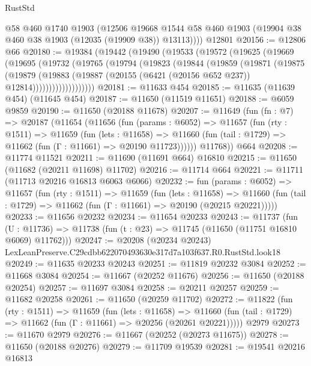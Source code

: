 \begin{lexlean}{RustStd}
\begin{coremodule}
        @58
        @460
        @1740
        @1903
        (@12506
          @19668
          @1544
          @58
          @460
          @1903
          (@19904 @38 @460 @38 @1903 (@12035 (@19909 @38)) @13113))))
    @12801
@20156 := @12806 @66
@20180 := @19384
    (@19442
      (@19490
        (@19533
          (@19572
            (@19625
              (@19669
                (@19695
                  (@19732
                    (@19765
                      (@19794
                        (@19823
                          (@19844
                            (@19859
                              (@19871
                                (@19875
                                  (@19879
                                    (@19883
                                      (@19887
                                        (@20155 (@6421 (@20156 @652 @237)) @12814)))))))))))))))))))
@20181 := @11633 @454
@20185 := @11635 (@11639 @454) (@11645 @454)
@20187 := @11650 (@11519 @11651)
@20188 := @6059 @9859
@20190 := @11650 (@20188 @11678)
@20207 := @11649
    (fun (fn : @7) =>
    @20187
      (@11654
        (@11656
          (fun (params : @6052) =>
          @11657
            (fun (rty : @1511) =>
            @11659
              (fun (lets : @11658) =>
              @11660 (fun (tail : @1729) => @11662 (fun (Γ : @11661) => @20190 @11723))))))
        @11768))
    @664
@20208 := @11774 @11521
@20211 := @11690 (@11691 @664) @16810
@20215 := @11650 (@11682 (@20211 @11698) @11702)
@20216 := @11714 @664
@20221 := @11711 (@11713 @20216 @16813 @6063 @6066)
@20232 := fun (params : @6052) =>
  @11657
    (fun (rty : @1511) =>
    @11659
      (fun (lets : @11658) =>
      @11660 (fun (tail : @1729) => @11662 (fun (Γ : @11661) => @20190 (@20215 @20221)))))
@20233 := @11656 @20232
@20234 := @11654 @20233
@20243 := @11737
    (fun (U : @11736) => @11738 (fun (t : @23) => @11745 (@11650 (@11751 @16810 @6069) @11762)))
@20247 := @20208 (@20234 @20243) LexLeanPreserve.C29cdbb622070493630e317d7a103f637.R0.RustStd.look18
@20249 := @11635 @20233 @20243
@20251 := @11819 @20232 @3084
@20252 := @11668 @3084
@20254 := @11667 (@20252 @11676)
@20256 := @11650 (@20188 @20254)
@20257 := @11697 @3084
@20258 := @20211 @20257
@20259 := @11682 @20258
@20261 := @11650 (@20259 @11702)
@20272 := @11822
    (fun (rty : @1511) =>
    @11659
      (fun (lets : @11658) =>
      @11660 (fun (tail : @1729) => @11662 (fun (Γ : @11661) => @20256 (@20261 @20221)))))
    @2979
@20273 := @11670 @2979
@20276 := @11667 (@20252 (@20273 @11675))
@20278 := @11650 (@20188 @20276)
@20279 := @11709 @19539
@20281 := @19541 @20216 @16813

\end{coremodule}
\end{lexlean}
